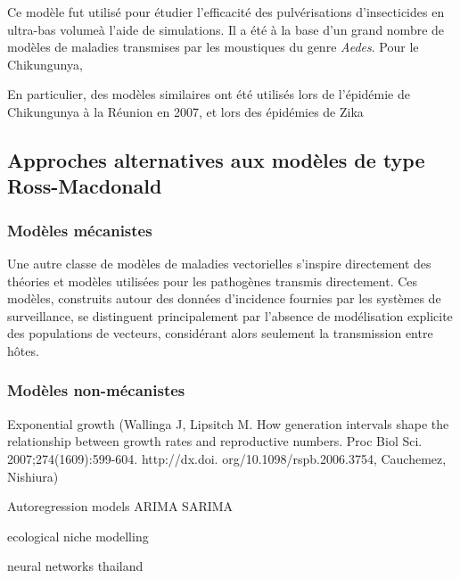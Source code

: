 Ce modèle fut utilisé pour étudier l'efficacité des pulvérisations d'insecticides en \guillemotleft ultra-bas volume\guillemotright à l'aide de simulations.
Il a été à la base d'un grand nombre de modèles de maladies transmises par les moustiques du genre {\em Aedes}.
Pour le Chikungunya, \cite{yakob_mathematical_2013}

En particulier, des modèles similaires ont été utilisés lors de l'épidémie de Chikungunya à la Réunion en 2007, et lors des épidémies de Zika






\subsection{Approches alternatives aux modèles de type Ross-Macdonald}
\label{sec:sir}

\subsubsection{Modèles mécanistes}

Une autre classe de modèles de maladies vectorielles s'inspire directement des théories et modèles utilisées pour les pathogènes transmis directement.
Ces modèles, construits autour des données d'incidence fournies par les systèmes de surveillance, se distinguent principalement par l'absence de modélisation explicite des populations de vecteurs, considérant alors seulement la transmission entre hôtes.

\subsubsection{Modèles non-mécanistes}

Exponential growth (Wallinga J, Lipsitch M. How generation intervals shape the
relationship between growth rates and reproductive numbers.
Proc Biol Sci. 2007;274(1609):599-604. http://dx.doi.
org/10.1098/rspb.2006.3754, 
Cauchemez, Nishiura)

Autoregression models ARIMA SARIMA

ecological niche modelling

neural networks thailand



